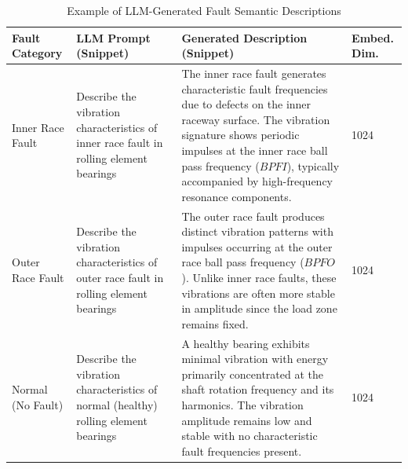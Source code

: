\begin{table}[htbp]
\centering
\caption{Example of LLM-Generated Fault Semantic Descriptions}
\label{tab:llm_descriptions}
\begin{tabular}{p{2.5cm}p{4.5cm}p{7.5cm}p{1.8cm}}
\toprule
\textbf{Fault Category} & \textbf{LLM Prompt (Snippet)} & \textbf{Generated Description (Snippet)} & \textbf{Embed. Dim.} \\
\midrule
Inner Race Fault & Describe the vibration characteristics of inner race fault in rolling element bearings & The inner race fault generates characteristic fault frequencies due to defects on the inner raceway surface. The vibration signature shows periodic impulses at the inner race ball pass frequency ($BPFI$), typically accompanied by high-frequency resonance components. & 1024 \\
\midrule
Outer Race Fault & Describe the vibration characteristics of outer race fault in rolling element bearings & The outer race fault produces distinct vibration patterns with impulses occurring at the outer race ball pass frequency ($BPFO$). Unlike inner race faults, these vibrations are often more stable in amplitude since the load zone remains fixed. & 1024 \\
\midrule
Normal (No Fault) & Describe the vibration characteristics of normal (healthy) rolling element bearings & A healthy bearing exhibits minimal vibration with energy primarily concentrated at the shaft rotation frequency and its harmonics. The vibration amplitude remains low and stable with no characteristic fault frequencies present. & 1024 \\
\bottomrule
\end{tabular}
\end{table}
